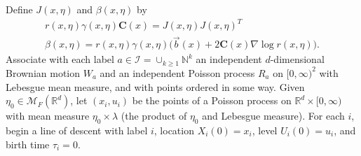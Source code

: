 \documentclass[EJP]{ejpecp} %
\newcommand{\IR}{\mathbb R}
\newcommand{\IN}{\mathbb N}
\newcommand{\grad}{\nabla}
\newcommand{\meanq}{\vec b}    %
\newcommand{\covq}{\mathbf{C}}     %
\newcommand{\labelspace}{\mathcal{I}} %
\newcommand{\measures}{\mathcal{M}_F(\IR^d)} %
\begin{document}
\begin{proposition}
    \label{prop:limiting_construction}
Define $J(x,\eta)$ and $\beta(x,\eta)$ by
\begin{gather*}
    r(x,\eta)\gamma(x,\eta)\covq(x) = J(x,\eta) J(x,\eta)^T \\
    \beta(x, \eta) = r(x,\eta)\gamma(x,\eta)\big(\meanq(x) + 2 \covq(x) \grad \log r(x, \eta)\big) .
\end{gather*}
Associate with each label $a \in \labelspace = \cup_{k\geq 1}\IN^k$
an independent $d$-dimensional Brownian motion $W_a$
and an independent Poisson process $R_a$ on $[0, \infty)^2$
with Lebesgue mean measure,
and with points ordered in some way.
Given $\eta_0 \in \measures$,
let $(x_i, u_i)$ be the points of a Poisson process
on $\IR^d \times [0, \infty)$ 
with mean measure $\eta_0\times \lambda$
(the product of $\eta_0$ and Lebesgue measure).
For each $i$, begin a line of descent
with label $i$, location $X_i(0) = x_i$, 
level $U_i(0) = u_i$, and birth time $\tau_i = 0$.


\end{proposition}
\end{document}
